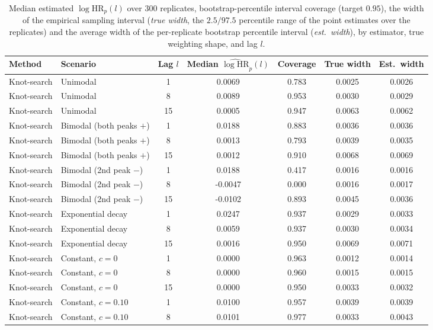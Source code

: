 \documentclass{article}
\begin{document}
\begin{table}[ht]
\centering
\caption{Median estimated $\log\mathrm{HR}_p(l)$ over $300$ replicates, bootstrap-percentile interval coverage (target $0.95$), the width of the empirical sampling interval (\emph{true width}, the $2.5/97.5$ percentile range of the point estimates over the replicates) and the average width of the per-replicate bootstrap percentile interval (\emph{est.\ width}), by estimator, true weighting shape, and lag $l$.}
\label{tab:coverage-widths}
\begin{tabular}{l l c c c c c}
\toprule
Method & Scenario & Lag $l$ & Median $\widehat{\log\mathrm{HR}}_p(l)$ & Coverage & True width & Est.\ width \\
\midrule
Knot-search & Unimodal & 1 & 0.0069 & 0.783 & 0.0025 & 0.0026 \\
Knot-search & Unimodal & 8 & 0.0089 & 0.953 & 0.0030 & 0.0029 \\
Knot-search & Unimodal & 15 & 0.0005 & 0.947 & 0.0063 & 0.0062 \\
Knot-search & Bimodal (both peaks $+$) & 1 & 0.0188 & 0.883 & 0.0036 & 0.0036 \\
Knot-search & Bimodal (both peaks $+$) & 8 & 0.0013 & 0.793 & 0.0039 & 0.0035 \\
Knot-search & Bimodal (both peaks $+$) & 15 & 0.0012 & 0.910 & 0.0068 & 0.0069 \\
Knot-search & Bimodal (2nd peak $-$) & 1 & 0.0188 & 0.417 & 0.0016 & 0.0016 \\
Knot-search & Bimodal (2nd peak $-$) & 8 & -0.0047 & 0.000 & 0.0016 & 0.0017 \\
Knot-search & Bimodal (2nd peak $-$) & 15 & -0.0102 & 0.893 & 0.0045 & 0.0036 \\
Knot-search & Exponential decay & 1 & 0.0247 & 0.937 & 0.0029 & 0.0033 \\
Knot-search & Exponential decay & 8 & 0.0059 & 0.937 & 0.0030 & 0.0034 \\
Knot-search & Exponential decay & 15 & 0.0016 & 0.950 & 0.0069 & 0.0071 \\
Knot-search & Constant, $c=0$ & 1 & 0.0000 & 0.963 & 0.0012 & 0.0014 \\
Knot-search & Constant, $c=0$ & 8 & 0.0000 & 0.960 & 0.0015 & 0.0015 \\
Knot-search & Constant, $c=0$ & 15 & 0.0000 & 0.950 & 0.0033 & 0.0032 \\
Knot-search & Constant, $c=0.10$ & 1 & 0.0100 & 0.957 & 0.0039 & 0.0039 \\
Knot-search & Constant, $c=0.10$ & 8 & 0.0101 & 0.977 & 0.0033 & 0.0043 \\

\end{tabular}
\end{table}
\end{document}

